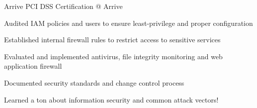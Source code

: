 
\begin{cventries}

  \cvproject
    {Arrive} %
    {PCI DSS Certification @ Arrive} %
    {} %
    {}
    {
      \begin{cvitems}  %
        \item {Audited IAM policies and users to ensure least-privilege and proper configuration}
        \item {Established internal firewall rules to restrict access to sensitive services}
        \item {Evaluated and implemented antivirus, file integrity monitoring and web application firewall}
        \item {Documented security standards and change control process}
        \item {Learned a ton about information security and common attack vectors!}
      \end{cvitems}
    }

\end{cventries}
